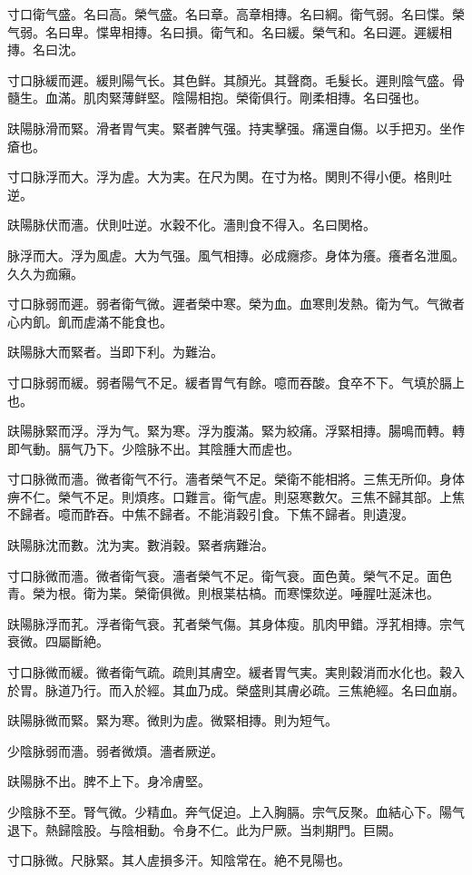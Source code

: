 \documentclass[b5paper,twoside,zihao=-4,UTF8]{ctexbook}
\begin{document}
寸口衛气盛。名曰高。榮气盛。名曰章。高章相摶。名曰綱。衛气弱。名曰惵。榮气弱。名曰卑。惵卑相摶。名曰損。衛气和。名曰緩。榮气和。名曰遲。遲緩相摶。名曰沈。

寸口脉緩而遲。緩則陽气长。其色鲜。其顏光。其聲商。毛髮长。遲則陰气盛。骨髓生。血滿。肌肉緊薄鲜堅。陰陽相抱。榮衛俱行。剛柔相摶。名曰强也。

趺陽脉滑而緊。滑者胃气実。緊者脾气强。持実擊强。痛還自傷。以手把刃。坐作瘡也。

寸口脉浮而大。浮为虗。大为実。在尺为関。在寸为格。関則不得小便。格則吐逆。

趺陽脉伏而濇。伏則吐逆。水穀不化。濇則食不得入。名曰関格。

脉浮而大。浮为風虗。大为气强。風气相摶。必成癮疹。身体为癢。癢者名泄風。久久为痂癩。

寸口脉弱而遲。弱者衛气微。遲者榮中寒。榮为血。血寒則发熱。衛为气。气微者心内飢。飢而虗滿不能食也。

趺陽脉大而緊者。当即下利。为難治。

寸口脉弱而緩。弱者陽气不足。緩者胃气有餘。噫而吞酸。食卒不下。气填於膈上也。

趺陽脉緊而浮。浮为气。緊为寒。浮为腹滿。緊为絞痛。浮緊相摶。腸鳴而轉。轉即气動。膈气乃下。少陰脉不出。其陰腫大而虗也。

寸口脉微而濇。微者衛气不行。濇者榮气不足。榮衛不能相將。三焦无所仰。身体痹不仁。榮气不足。則煩疼。口難言。衛气虗。則惡寒數欠。三焦不歸其部。上焦不歸者。噫而酢吞。中焦不歸者。不能消穀引食。下焦不歸者。則遺溲。

趺陽脉沈而數。沈为実。數消穀。緊者病難治。

寸口脉微而濇。微者衛气衰。濇者榮气不足。衛气衰。面色黄。榮气不足。面色青。榮为根。衛为枼。榮衛俱微。則根枼枯槁。而寒慄欬逆。唾腥吐涎沫也。

趺陽脉浮而芤。浮者衛气衰。芤者榮气傷。其身体瘦。肌肉甲錯。浮芤相摶。宗气衰微。四屬斷絶。

寸口脉微而緩。微者衛气疏。疏則其膚空。緩者胃气実。実則穀消而水化也。穀入於胃。脉道乃行。而入於經。其血乃成。榮盛則其膚必疏。三焦絶經。名曰血崩。

趺陽脉微而緊。緊为寒。微則为虗。微緊相摶。則为短气。

少陰脉弱而濇。弱者微煩。濇者厥逆。

趺陽脉不出。脾不上下。身冷膚堅。

少陰脉不至。腎气微。少精血。奔气促迫。上入胸膈。宗气反聚。血結心下。陽气退下。熱歸陰股。与陰相動。令身不仁。此为尸厥。当刺期門。巨闕。

寸口脉微。尺脉緊。其人虗損多汗。知陰常在。絶不見陽也。
\end{document}
